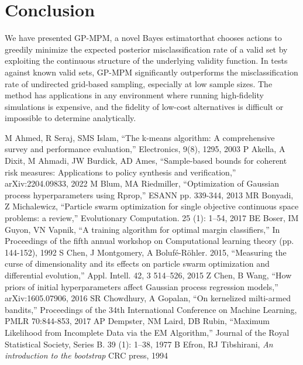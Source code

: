 \documentclass{amsart}
\begin{document}
\section{Conclusion}

We have presented GP-MPM, a novel Bayes estimatorthat chooses actions to greedily minimize the expected posterior misclassification rate of a valid set by exploiting the continuous structure of the underlying validity function. In tests against known valid sets, GP-MPM significantly outperforms the misclassification rate of undirected grid-based sampling, especially at low sample sizes. The method has applications in any environment where running high-fidelity simulations is expensive, and the fidelity of low-cost alternatives is difficult or impossible to determine analytically.

\begin{thebibliography}{00}
\balance
{} M Ahmed, R Seraj, SMS Islam, ``The k-means algorithm: A comprehensive survey and performance evaluation,'' Electronics, 9(8), 1295, 2003
 P Akella, A Dixit, M Ahmadi, JW Burdick, AD Ames, ``Sample-based bounds for coherent risk measures: Applications to policy synthesis and verification,'' arXiv:2204.09833, 2022 
 M Blum, MA Riedmiller, ``Optimization of Gaussian process hyperparameters using Rprop,'' ESANN pp. 339-344, 2013
 MR Bonyadi, Z Michalewicz, ``Particle swarm optimization for single objective continuous space problems: a review,'' Evolutionary Computation. 25 (1): 1–54, 2017 
 BE Boser, IM Guyon, VN Vapnik, ``A training algorithm for optimal margin classifiers,'' In Proceedings of the fifth annual workshop on Computational learning theory (pp. 144-152), 1992
 S Chen, J Montgomery, A Bolufé-Röhler. 2015, ``Measuring the curse of dimensionality and its effects on particle swarm optimization and differential evolution,'' Appl. Intell. 42, 3 514–526, 2015
 Z Chen, B Wang, ``How priors of initial hyperparameters affect Gaussian process regression models,'' arXiv:1605.07906, 2016
 SR Chowdhury, A Gopalan, ``On kernelized milti-armed bandits,'' Proceedings of the 34th International Conference on Machine Learning, PMLR 70:844-853, 2017
 AP Dempster, NM Laird, DB Rubin, ``Maximum Likelihood from Incomplete Data via the EM Algorithm,'' Journal of the Royal Statistical Society, Series B. 39 (1): 1–38, 1977
 B Efron, RJ Tibshirani, \textit{An introduction to the bootstrap} CRC press, 1994

\end{thebibliography}
\end{document}
